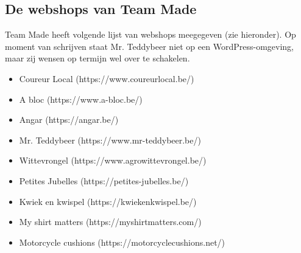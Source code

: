 \subsection{De webshops van Team Made}
Team Made heeft volgende lijst van webshops meegegeven (zie hieronder). Op moment van schrijven staat Mr. Teddybeer niet op een WordPress-omgeving, maar zij wensen op termijn wel over te schakelen.
\begin{itemize}
    \item Coureur Local (https://www.coureurlocal.be/)
    \item A bloc (https://www.a-bloc.be/)
    \item Angar (https://angar.be/)
    \item Mr. Teddybeer (https://www.mr-teddybeer.be/)
    \item Wittevrongel (https://www.agrowittevrongel.be/)
    \item Petites Jubelles (https://petites-jubelles.be/)
    \item Kwiek en kwispel (https://kwiekenkwispel.be/)
    \item My shirt matters (https://myshirtmatters.com/)
    \item Motorcycle cushions (https://motorcyclecushions.net/)
\end{itemize} 
